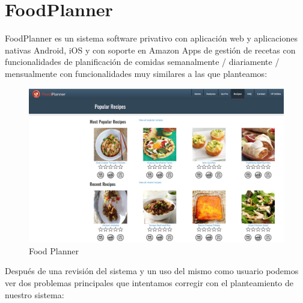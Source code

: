 \documentclass[12pt, a4paper, twoside]{book}
\begin{document}
	\section{FoodPlanner}
	FoodPlanner es un sistema software privativo con aplicación web y aplicaciones nativas Android, iOS y con soporte en Amazon Apps de gestión de recetas con funcionalidades de planificación de comidas semanalmente / diariamente / mensualmente con funcionalidades muy similares a las que planteamos:
	\begin{center}
		\begin{figure}[H]
			\centering
			\includegraphics[width=15cm]{Imagenes/FoodPlanner.png}
			\caption{Food Planner}\label{Food Planner}
		\end{figure}
	\end{center}
	Después de una revisión del sistema y un uso del mismo como usuario podemos ver dos problemas principales que intentamos corregir con el planteamiento de nuestro sistema:
\end{document}
